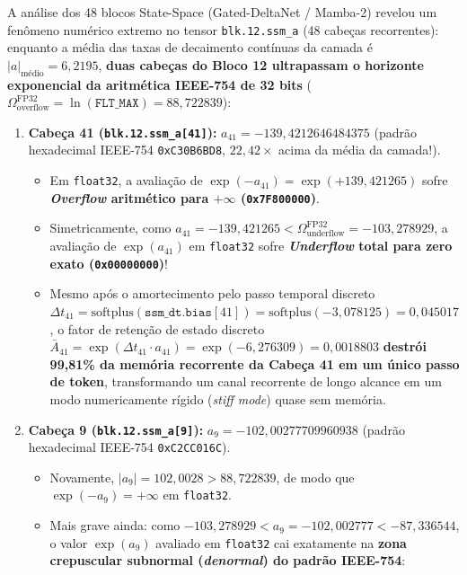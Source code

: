 \documentclass[11pt,a4paper]{article}
\theoremstyle{definition}
\begin{document}
A análise dos 48 blocos State-Space (Gated-DeltaNet / Mamba-2) revelou um fenômeno numérico extremo no tensor \texttt{blk.12.ssm\_a} (48 cabeças recorrentes): enquanto a média das taxas de decaimento contínuas da camada é $|a|_{\text{médio}} = 6{,}2195$, \textbf{duas cabeças do Bloco 12 ultrapassam o horizonte exponencial da aritmética IEEE-754 de 32 bits} ($\Omega_{\text{overflow}}^{\text{FP32}} = \ln(\texttt{FLT\_MAX}) = 88{,}722839$):
\begin{enumerate}
    \item \textbf{Cabeça 41 (\texttt{blk.12.ssm\_a[41]}):} $a_{41} = -139{,}4212646484375$ (padrão hexadecimal IEEE-754 \texttt{0xC30B6BD8}, $22{,}42\times$ acima da média da camada!).
    \begin{itemize}
        \item Em \texttt{float32}, a avaliação de $\exp(-a_{41}) = \exp(+139{,}421265)$ sofre \textbf{\textit{Overflow} aritmético para $+\infty$ (\texttt{0x7F800000})}.
        \item Simetricamente, como $a_{41} = -139{,}421265 < \Omega_{\text{underflow}}^{\text{FP32}} = -103{,}278929$, a avaliação de $\exp(a_{41})$ em \texttt{float32} sofre \textbf{\textit{Underflow} total para zero exato (\texttt{0x00000000})}!
        \item Mesmo após o amortecimento pelo passo temporal discreto $\Delta t_{41} = \text{softplus}(\texttt{ssm\_dt.bias}[41]) = \text{softplus}(-3{,}078125) = 0{,}045017$, o fator de retenção de estado discreto $\bar{A}_{41} = \exp(\Delta t_{41} \cdot a_{41}) = \exp(-6{,}276309) = 0{,}0018803$ \textbf{destrói 99,81\% da memória recorrente da Cabeça 41 em um único passo de token}, transformando um canal recorrente de longo alcance em um modo numericamente rígido (\textit{stiff mode}) quase sem memória.
    \end{itemize}
    \item \textbf{Cabeça 9 (\texttt{blk.12.ssm\_a[9]}):} $a_9 = -102{,}00277709960938$ (padrão hexadecimal IEEE-754 \texttt{0xC2CC016C}).
    \begin{itemize}
        \item Novamente, $|a_9| = 102{,}0028 > 88{,}722839$, de modo que $\exp(-a_9) = +\infty$ em \texttt{float32}.
        \item Mais grave ainda: como $-103{,}278929 < a_9 = -102{,}002777 < -87{,}336544$, o valor $\exp(a_9)$ avaliado em \texttt{float32} cai exatamente na \textbf{zona crepuscular subnormal (\textit{denormal}) do padrão IEEE-754}:
        \begin{equation}

\end{equation}
\end{itemize}
\end{enumerate}
\end{document}
